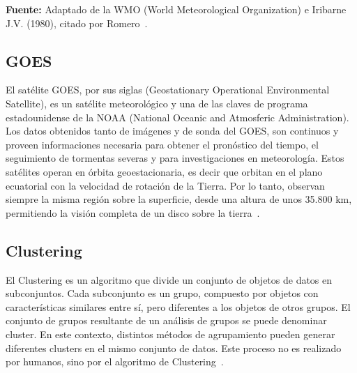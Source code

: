 \documentclass[twocolumn]{IECEjournal} %
\begin{document}
\begin{table}[h]
    \centering    
    \caption{Género, abreviaciòn y altura  en la atmósfera de las nubes.} \label{tab1}
    \scriptsize %
\end{table}
\scriptsize \textbf{Fuente:} Adaptado de la WMO (World Meteorological Organization) e Iribarne J.V. (1980), citado por Romero~\cite{7}.\\
\normalsize
\subsection{GOES}
El satélite GOES, por sus siglas (Geostationary Operational 
Environmental Satellite), es un  satélite meteorológico y una de las claves de programa estadounidense de la NOAA (National Oceanic and Atmosferic Administration). Los datos obtenidos tanto de imágenes y de sonda del GOES, son continuos y proveen informaciones necesaria para obtener el pronóstico del tiempo, el seguimiento de tormentas severas y para investigaciones en meteorología. Estos satélites operan en órbita geoestacionaria, es decir que orbitan en el plano ecuatorial con la velocidad de rotación de la Tierra. Por lo 
tanto, observan siempre la misma región sobre la superficie, desde una altura de unos 35.800 km, permitiendo la visión completa de un disco sobre la tierra~\cite{6}.

\subsection{Clustering}
El Clustering es un algoritmo que divide un conjunto de objetos de datos en subconjuntos. Cada subconjunto es un grupo, compuesto por objetos con características similares entre sí, pero diferentes a los objetos de otros grupos. El conjunto de grupos resultante de un análisis de grupos se puede denominar cluster. En este contexto, distintos métodos de agrupamiento pueden generar diferentes clusters en el mismo conjunto de datos. Este proceso no es realizado por humanos, sino por el algoritmo de Clustering~\cite{8}.
\end{document}
